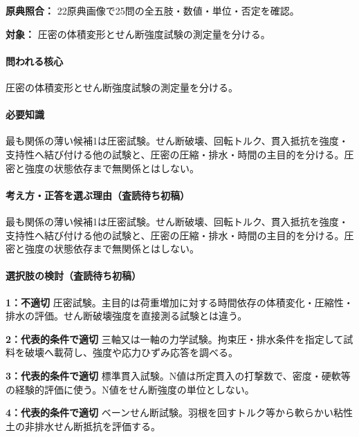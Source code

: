\noindent\textbf{原典照合：} 22原典画像で25問の全五肢・数値・単位・否定を確認。\par

\noindent\textbf{対象：} 圧密の体積変形とせん断強度試験の測定量を分ける。\par

\paragraph{問われる核心} 圧密の体積変形とせん断強度試験の測定量を分ける。

\paragraph{必要知識} 最も関係の薄い候補1は圧密試験。せん断破壊、回転トルク、貫入抵抗を強度・支持性へ結び付ける他の試験と、圧密の圧縮・排水・時間の主目的を分ける。圧密と強度の状態依存まで無関係とはしない。

\paragraph{考え方・正答を選ぶ理由（査読待ち初稿）} 最も関係の薄い候補1は圧密試験。せん断破壊、回転トルク、貫入抵抗を強度・支持性へ結び付ける他の試験と、圧密の圧縮・排水・時間の主目的を分ける。圧密と強度の状態依存まで無関係とはしない。

\paragraph{選択肢の検討（査読待ち初稿）}\mbox{}\par

\noindent\textbf{1：不適切} 圧密試験。主目的は荷重増加に対する時間依存の体積変化・圧縮性・排水の評価。せん断破壊強度を直接測る試験とは違う。\par

\noindent\textbf{2：代表的条件で適切} 三軸又は一軸の力学試験。拘束圧・排水条件を指定して試料を破壊へ載荷し、強度や応力ひずみ応答を調べる。\par

\noindent\textbf{3：代表的条件で適切} 標準貫入試験。N値は所定貫入の打撃数で、密度・硬軟等の経験的評価に使う。N値をせん断強度の単位としない。\par

\noindent\textbf{4：代表的条件で適切} ベーンせん断試験。羽根を回すトルク等から軟らかい粘性土の非排水せん断抵抗を評価する。\par

